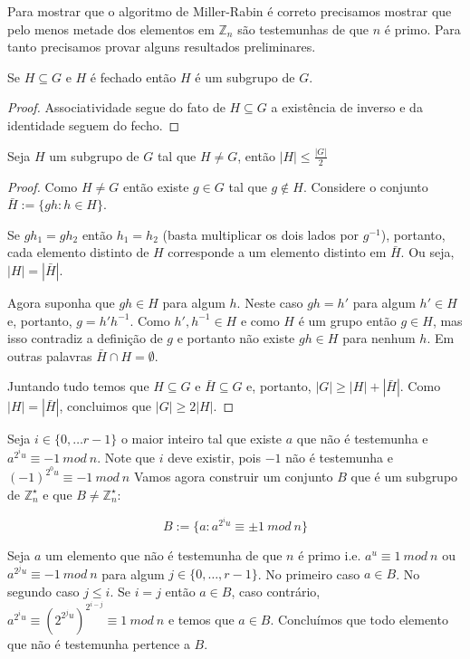 
Para mostrar que o algoritmo de Miller-Rabin é correto precisamos mostrar que pelo menos metade dos elementos em $\mathbb{Z}_n$ são testemunhas de que $n$ é primo.
Para tanto precisamos provar alguns resultados preliminares.


\begin{lemma}
  Se $H \subseteq G$ e $H$ é fechado então $H$ é um subgrupo de $G$. 
\end{lemma}
\begin{proof}
  Associatividade segue do fato de $H \subseteq G$ a existência de inverso e da identidade seguem do fecho.
\end{proof}

\begin{lemma}
Seja $H$ um subgrupo de $G$ tal que $H \neq G$, então $|H| \leq \frac{|G|}{2}$  
\end{lemma}
\begin{proof}
Como $H \neq G$ então existe $g \in G$ tal que $g \notin H$.
Considere o conjunto $\bar{H} := \{gh : h \in H\}$.

Se $gh_1 = gh_2$ então $h_1 = h_2$ (basta multiplicar os dois lados por $g^{-1}$), portanto, cada elemento distinto de $H$ corresponde a um elemento distinto em $\bar{H}$.
Ou seja, $|H| = |\bar{H}|$.

Agora suponha que $gh \in H$ para algum $h$.
Neste caso $gh = h'$ para algum $h' \in H$ e, portanto, $g = h'h^{-1}$.
Como $h', h^{-1} \in H$ e como $H$ é um grupo então $g \in H$, mas isso contradiz a definição de $g$ e portanto não existe $gh \in H$ para nenhum $h$.
Em outras palavras $\bar{H} \cap H = \emptyset$.

Juntando tudo temos que $H \subseteq G$ e $\bar{H} \subseteq G$ e, portanto, $|G| \geq |H| + |\bar{H}|$.
Como $|H| = |\bar{H}|$, concluimos que   $|G| \geq 2|H|$.
\end{proof}

Seja $i \in \{0, \dots r-1\}$ o maior inteiro tal que existe $a$ que não é testemunha e $a^{2^iu} \equiv -1\ mod\ n$.
Note que $i$ deve existir, pois $-1$ não é testemunha e $(-1)^{2^0u} \equiv -1\ mod\ n$ 
Vamos agora construir um conjunto $B$ que é um subgrupo de $\mathbb{Z}_n^\star$ e que $B \neq \mathbb{Z}_n^\star$:

\begin{displaymath}
  B := \{a : a^{2^iu} \equiv \pm 1\ mod\ n\}
\end{displaymath}

Seja $a$ um elemento que não é testemunha de que $n$ é primo i.e. $a^u \equiv 1\ mod\ n$ ou $a^{2^ju} \equiv -1\ mod\ n$ para algum $j \in \{0, \dots, r-1\}$.
No primeiro caso $a \in B$.
No segundo caso $j \leq i$.
Se $i =j$ então $a \in B$, caso contrário, $a^{2^iu} \equiv (2^{2^ju})^{2^{i-j}} \equiv 1\ mod\ n$ e temos que $a \in B$.
Concluímos que todo elemento que não é testemunha pertence a $B$.

